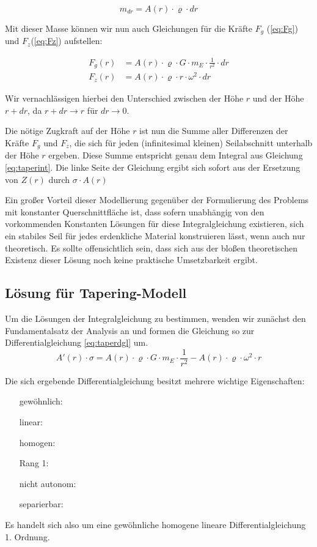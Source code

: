 \documentclass[a4paper, 10pt]{report}
\begin{document}
\begin{equation}
m_{dr} = A(r) \cdot \varrho \cdot dr
\label{eq:samass}
\end{equation}

Mit dieser Masse können wir nun auch Gleichungen für die Kräfte $F_g$ (\ref{eq:Fg}) und $F_z$(\ref{eq:Fz}) aufstellen:

\begin{align}
F_g(r) &= A(r) \cdot \varrho \cdot G \cdot m_E \cdot \frac{1}{r^2} \cdot dr\label{eq:Fg}\\
F_z(r) &= A(r) \cdot \varrho \cdot r \cdot \omega^2 \cdot dr\label{eq:Fz}
\end{align}

Wir vernachlässigen hierbei den Unterschied zwischen der Höhe $r$ und der Höhe $r+dr$, da $r+dr\rightarrow r$ für $dr \rightarrow 0$.

Die nötige Zugkraft auf der Höhe $r$ ist nun die Summe aller Differenzen der Kräfte $F_g$ und $F_z$, die sich für jeden (infinitesimal kleinen) Seilabschnitt unterhalb der Höhe $r$ ergeben. Diese Summe entspricht genau dem Integral aus Gleichung \ref{eq:taperint}. Die linke Seite der Gleichung ergibt sich sofort aus der Ersetzung von $Z(r)$ durch $\sigma \cdot A(r)$

Ein großer Vorteil dieser Modellierung gegenüber der Formulierung des Problems mit konstanter Querschnittfläche ist, dass sofern unabhängig von den vorkommenden Konstanten Lösungen für diese Integralgleichung existieren, sich ein stabiles Seil für jedes erdenkliche Material konstruieren lässt, wenn auch nur theoretisch. Es sollte offensichtlich sein, dass sich aus der bloßen theoretischen Existenz dieser Lösung noch keine praktische Umsetzbarkeit ergibt.

\subsection{Lösung für Tapering-Modell}

Um die Lösungen der Integralgleichung zu bestimmen, wenden wir zunächst den Fundamentalsatz der Analysis an und formen die Gleichung so zur Differentialgleichung \ref{eq:taperdgl} um.
\begin{equation}
A'(r) \cdot \sigma = A(r) \cdot \varrho \cdot G \cdot m_E \cdot \frac{1}{r^2} - A(r) \cdot \varrho \cdot \omega^2 \cdot r
\label{eq:taperdgl}
\end{equation}

Die sich ergebende Differentialgleichung besitzt mehrere wichtige Eigenschaften:
\begin{itemize}
\item[gewöhnlich:]
\item[linear:]
\item[homogen:]
\item[Rang 1:]
\item[nicht autonom:] 
\item[separierbar:]
\end{itemize}
Es handelt sich also um eine gewöhnliche homogene lineare Differentialgleichung 1. Ordnung.
\end{document}
